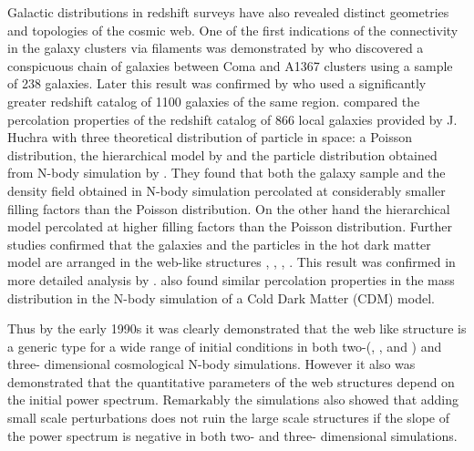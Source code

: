 Galactic distributions in redshift surveys have also revealed distinct geometries and topologies of the cosmic web. One of the first indications of the connectivity in the galaxy clusters via filaments was demonstrated by \cite{Gregory1978} who discovered a conspicuous chain of galaxies between Coma and A1367 clusters using a sample of 238 galaxies. Later  this result was confirmed by \cite{Lapparent1986} who used a significantly greater redshift catalog of 1100 galaxies of the same region. \cite{Zeldovich1982} compared the percolation properties of the redshift catalog of 866 local galaxies provided by J. Huchra with three theoretical distribution of particle in space: a Poisson distribution, the  hierarchical model by \cite{Soneira1978} and the particle distribution obtained from N-body simulation by \cite{Klypin1983a}.  They found that both the galaxy sample and the density field obtained in N-body simulation percolated at considerably smaller filling factors  than  the Poisson distribution. On the other hand the  hierarchical model percolated at higher filling factors  than  the Poisson distribution. Further studies confirmed that the galaxies and the particles in the hot dark matter  model are arranged in the web-like structures \cite{Zeldovich1982}, \cite{Shandarin1983}, \cite{Shandarin1983b}, \cite{Shandarin1984}. This result was confirmed in more detailed analysis by \cite{Einasto1984}. \cite{Melott1983b} also found similar percolation properties in the mass distribution in the N-body simulation of a Cold Dark Matter (CDM) model.
 
Thus by the  early 1990s it was clearly demonstrated that the web like structure is a generic type for a wide range of initial conditions in both two-(\citealt{Doroshkevich1980}, \citealt{Doroshkevich1989}, \citealt{Melott1990} and \citealt{Beacom1991}) and three- dimensional \citep{Melott1993} cosmological N-body simulations. However it also was demonstrated that the quantitative parameters of the web structures depend on the initial power spectrum. Remarkably the simulations also showed that  adding small scale perturbations does not ruin the large scale structures if the slope of the power spectrum is negative in both two- and three- dimensional simulations.

